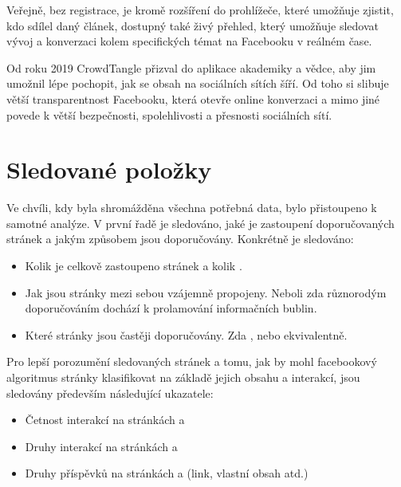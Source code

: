     Veřejně, bez registrace, je kromě rozšíření do prohlížeče, které umožňuje zjistit, kdo sdílel daný článek, dostupný také živý přehled, který umožňuje sledovat vývoj a konverzaci kolem specifických témat na Facebooku v reálném čase.
    
    Od roku 2019 CrowdTangle přizval do aplikace akademiky a vědce, aby jim umožnil lépe pochopit, jak se obsah na sociálních sítích šíří. Od toho si slibuje větší transparentnost Facebooku, která otevře online konverzaci a mimo jiné povede k větší bezpečnosti, spolehlivosti a přesnosti sociálních sítí. ~\citep{bleakley_2021}


\section{Sledované položky}
  Ve chvíli, kdy byla shromážděna všechna potřebná data, bylo přistoupeno k samotné analýze. V první řadě je sledováno, jaké je zastoupení doporučovaných stránek a jakým způsobem jsou doporučovány. Konkrétně je sledováno:
  
\begin{itemize}
    \item Kolik je celkově zastoupeno stránek  a kolik .
    \item Jak jsou stránky mezi sebou vzájemně propojeny. Neboli zda různorodým doporučováním dochází k prolamování informačních bublin.
    \item Které stránky jsou častěji doporučovány. Zda ,  nebo ekvivalentně. 
\end{itemize}
  
  Pro lepší porozumění sledovaných stránek a tomu, jak by mohl facebookový algoritmus stránky klasifikovat na základě jejich obsahu a interakcí, jsou sledovány především následující ukazatele: 
  
 \begin{itemize}
    \item Četnost interakcí na stránkách  a  
    \item Druhy interakcí na stránkách  a 
    \item Druhy příspěvků na stránkách  a  (link, vlastní obsah atd.)
\end{itemize}
  

